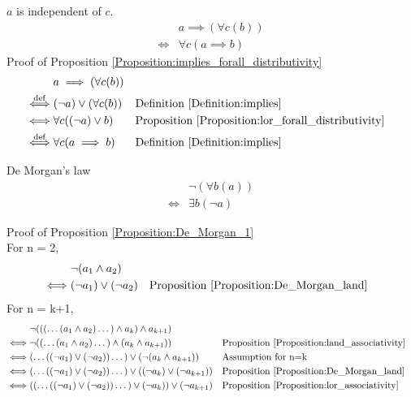 \begin{prop}
\label{Proposition:implies_forall_distributivity}
$a$ is independent of $c$.
\begin{align*}
& a \implies (\forall c (b)) \\
\iff & \forall c (a \implies b)
\end{align*}
Proof of Proposition \ref{Proposition:implies_forall_distributivity}
\begin{align*}
& a \implies (\forall c (b)) \\
\overset{\operatorname{def}}{\iff} & (\lnot a) \lor (\forall c (b))
& & \text{Definition \ref{Definition:implies}} \\
\iff & \forall c ((\lnot a) \lor b)
& & \text{Proposition \ref{Proposition:lor_forall_distributivity}} \\
\overset{\operatorname{def}}{\iff} & \forall c (a \implies b)
& & \text{Definition \ref{Definition:implies}} \\
\end{align*}
\end{prop}

\begin{prop}
\label{Proposition:De_Morgan_1}
De Morgan's law
\begin{align*}
& \lnot (\forall b (a)) \\
\iff & \exists b (\lnot a)
\end{align*}
\end{prop}

Proof of Proposition \ref{Proposition:De_Morgan_1} \\
For n = 2,
\begin{align*}
& \lnot (a_1 \land a_2) \\
\iff & (\lnot a_1) \lor (\lnot a_2)
& & \text{Proposition \ref{Proposition:De_Morgan_land}} \\
\end{align*}
For n = k+1,
\begin{align*}
& \lnot ((( \dots (a_1 \land a_2) \dots ) \land a_k ) \land a_{k+1}) \\
\iff & \lnot (( \dots (a_1 \land a_2) \dots ) \land ( a_k \land a_{k+1}))
& & \text{Proposition \ref{Proposition:land_associativity}} \\
\iff & ( \dots ((\lnot a_1) \lor (\lnot a_2)) \dots ) \lor (\lnot (a_k \land a_{k+1}))
& & \text{Assumption for n=k} \\
\iff & ( \dots ((\lnot a_1) \lor (\lnot a_2)) \dots ) \lor ((\lnot a_k) \lor (\lnot a_{k+1}))
& & \text{Proposition \ref{Proposition:De_Morgan_land}} \\
\iff & (( \dots ((\lnot a_1) \lor (\lnot a_2)) \dots ) \lor (\lnot a_k)) \lor (\lnot a_{k+1})
& & \text{Proposition \ref{Proposition:lor_associativity}} \\
\end{align*}

